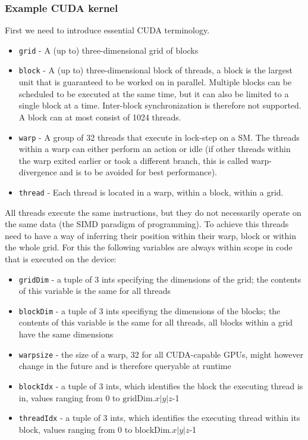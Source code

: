 \documentclass[english,11pt,a4paper,table]{article} %
\begin{document}
\subsubsection{Example CUDA kernel}

First we need to introduce essential CUDA terminology.

\begin{itemize}
	\item \texttt{grid} - A (up to) three-dimensional grid of blocks
	\item \texttt{block} - A (up to) three-dimensional block of threads, a block is the largest unit that is guaranteed to be worked on in parallel. Multiple blocks can be scheduled to be executed at the same time, but it can also be limited to a single block at a time. Inter-block synchronization is therefore not supported. A block can at most consist of 1024 threads.
	\item \texttt{warp} - A group of 32 threads that execute in lock-step on a SM. The threads within a warp can either perform an action or idle (if other threads within the warp exited earlier or took a different branch, this is called warp-divergence and is to be avoided for best performance).
	\item \texttt{thread} - Each thread is located in a warp, within a block, within a grid.
\end{itemize}

All threads execute the same instructions, but they do not necessarily operate on the same data (the SIMD paradigm of programming).
To achieve this threads need to have a way of inferring their position within their warp, block or within the whole grid.
For this the following variables are always within scope in code that is executed on the device:

\begin{itemize}
	\item \texttt{gridDim} - a tuple of 3 ints specifying the dimensions of the grid; the contents of this variable is the same for all threads
	\item \texttt{blockDim} - a tuple of 3 ints specifiyng the dimensions of the blocks; the contents of this variable is the same for all threads, all blocks within a grid have the same dimensions
	\item \texttt{warpsize} - the size of a warp, 32 for all CUDA-capable GPUs, might however change in the future and is therefore queryable at runtime
	\item \texttt{blockIdx} - a tuple of 3 ints, which identifies the block the executing thread is in, values ranging from $0$ to $\text{gridDim}.x|y|z$-1
	\item \texttt{threadIdx} - a tuple of 3 ints, which identifies the executing thread within its block, values ranging from $0$ to $\text{blockDim}.x|y|z$-1
\end{itemize}
\end{document}
